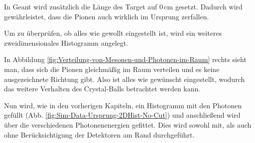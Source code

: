 \documentclass[a4paper,11pt,oneside,final,german,openbib,pdftex]{scrbook}
\begin{document}
{In Geant wird zus\"atzlich die Länge des Target auf $0\,\text{cm}$ gesetzt. Dadurch wird gewährleistet, dass die Pionen auch wirklich im Ursprung zerfallen.




Um zu überprüfen, ob alles wie gewollt eingestellt ist, wird ein weiteres zweidimensionales Histogramm angelegt.



In Abbildung \ref{fig:Verteilung-von-Mesonen-und-Photonen-im-Raum} rechts sieht man, dass sich die Pionen gleichm\"a{\ss}ig im Raum verteilen und es keine ausgezeichnete Richtung gibt. Also ist alles wie gew\"unscht eingestellt, wodurch das weitere Verhalten des Crystal-Balls betrachtet werden kann.

Nun wird, wie in den vorherigen Kapiteln, ein Histogramm mit den Photonen gefüllt (Abb. \ref{fig:Sim-Data-Ursprung-2DHist-No-Cut}) und anschließend wird über die verschiedenen Photonenenergien gefittet. Dies wird sowohl mit, als auch ohne Berücksichtigung der Detektoren am Rand durchgeführt.

}
\end{document}
